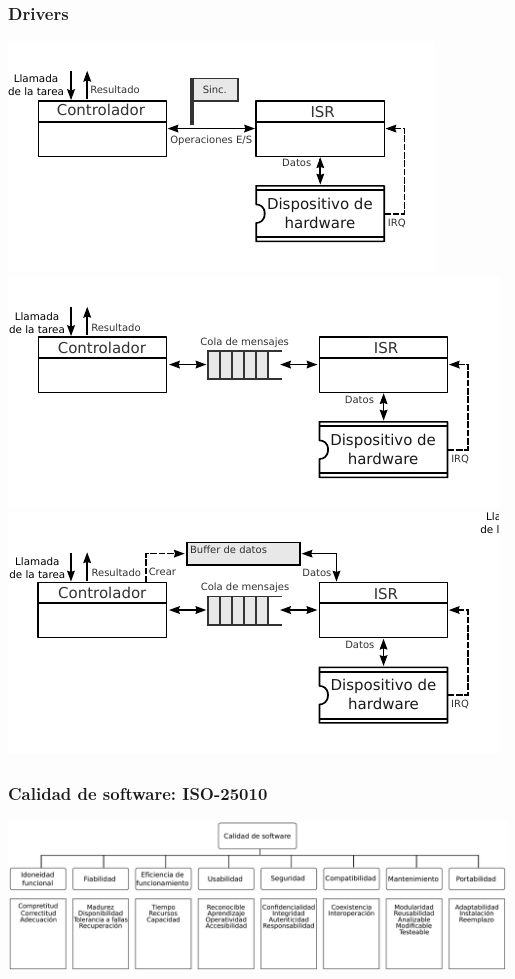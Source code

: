 \documentclass[xcolor=dvipsnames]{beamer}
\begin{document}
    \begin{frame}
        \frametitle{Drivers}
        \centering
        \includegraphics[height=0.3\textheight]{img/driver_sincrono.pdf}\\
        \includegraphics[height=0.3\textheight]{img/driver_asincrono.pdf}\\
        \includegraphics[height=0.3\textheight]{img/driver_serial.pdf}
    \end{frame}
    
    \begin{frame}
        \frametitle{Calidad de software: ISO-25010}
        \centering
        \includegraphics[width=0.99\textwidth]{img/ISO25010.pdf}\\
    \end{frame}
    
\end{document}
